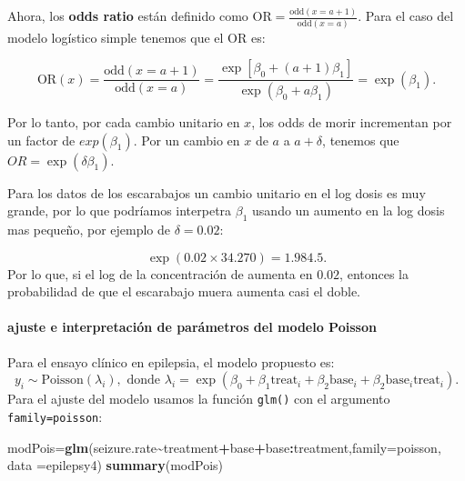 \documentclass[
]{article}
\newenvironment{Shaded}{\begin{snugshade}}{\end{snugshade}}
\newcommand{\AttributeTok}[1]{\textcolor[rgb]{0.13,0.29,0.53}{#1}}
\newcommand{\FunctionTok}[1]{\textcolor[rgb]{0.13,0.29,0.53}{\textbf{#1}}}
\newcommand{\NormalTok}[1]{#1}
\newcommand{\OtherTok}[1]{\textcolor[rgb]{0.56,0.35,0.01}{#1}}
\newcommand{\SpecialCharTok}[1]{\textcolor[rgb]{0.81,0.36,0.00}{\textbf{#1}}}
\begin{document}
Ahora, los \textbf{odds ratio} están definido como \(\text{OR}=\frac{\text{odd}(x=a+1)}{\text{odd}(x=a)}\). Para el caso del modelo logístico simple tenemos que el OR es:

\[
\mbox{OR}(x)=\frac{\text{odd}(x=a+1)}{\text{odd}(x=a)}=\frac{\exp\left[\beta_{0}+(a+1)\beta_{1}\right]}{\exp(\beta_0+a\beta_1)}=\exp(\beta_1).
\]

Por lo tanto, por cada cambio unitario en \(x\), los odds de morir incrementan por un factor de \(exp(\beta_1)\). Por un cambio en \(x\) de \(a\) a \(a+\delta\), tenemos que \(OR=\exp(\delta\beta_1)\).

Para los datos de los escarabajos un cambio unitario en el log dosis es muy grande, por lo que podríamos interpetra \(\beta_1\) usando un aumento en la log dosis mas pequeño, por ejemplo de \(\delta=0.02\):

\[
\exp ( 0.02\times  34.270) = 1.984.
5.
\]
Por lo que, si el log de la concentración de aumenta en \(0.02\), entonces la probabilidad de que el escarabajo muera aumenta casi el doble.

\paragraph{ajuste e interpretación de parámetros del modelo Poisson}\label{ajuste-e-interpretaciuxf3n-de-paruxe1metros-del-modelo-poisson}

Para el ensayo clínico en epilepsia, el modelo propuesto es:
\[
y_i \sim \mbox{Poisson}(\lambda_i), \mbox{ donde } \lambda_i=\exp(\beta_0+\beta_1\text{treat}_i+\beta_2\text{base}_i+\beta_2\text{base}_i\text{treat}_i).
\]
Para el ajuste del modelo usamos la función \texttt{glm()} con el argumento \texttt{family=poisson}:

\begin{Shaded}
\begin{Highlighting}[]
\NormalTok{modPois}\OtherTok{=}\FunctionTok{glm}\NormalTok{(seizure.rate}\SpecialCharTok{\textasciitilde{}}\NormalTok{treatment}\SpecialCharTok{+}\NormalTok{base}\SpecialCharTok{+}\NormalTok{base}\SpecialCharTok{:}\NormalTok{treatment,}\AttributeTok{family=}\NormalTok{poisson,}
            \AttributeTok{data =}\NormalTok{epilepsy4)}
\FunctionTok{summary}\NormalTok{(modPois)}
\end{Highlighting}
\end{Shaded}
\end{document}
